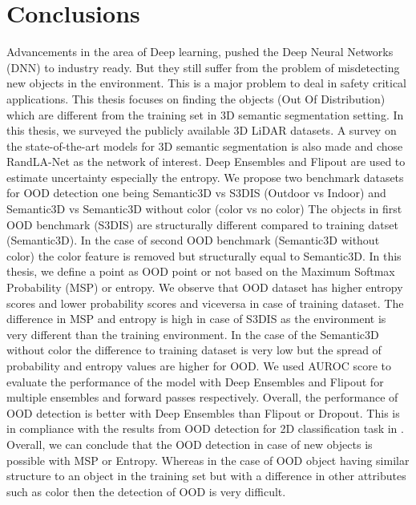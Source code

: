 

    \chapter{Conclusions}
    Advancements in the area of Deep learning, pushed the Deep Neural Networks (DNN) to industry ready.
    But they still suffer from the problem of misdetecting new objects in the environment.
    This is a major problem to deal in safety critical applications.
    This thesis focuses on finding the objects (Out Of Distribution) which are different from the training set in 3D semantic segmentation setting.
    In this thesis, we surveyed the publicly available 3D LiDAR datasets.
    A survey on the  state-of-the-art models for 3D semantic segmentation is also made and chose RandLA-Net as the network of interest.
    Deep Ensembles and Flipout are used to estimate uncertainty especially the entropy. 
    We propose two benchmark datasets for OOD detection one being Semantic3D vs S3DIS (Outdoor vs Indoor) and Semantic3D vs Semantic3D without color (color vs no color)
    The objects in first OOD benchmark (S3DIS) are structurally different compared to training datset (Semantic3D).
    In the case of second OOD benchmark (Semantic3D without color) the color feature is removed but structurally equal to Semantic3D.
    In this thesis, we define a point as OOD point or not based on the Maximum Softmax Probability (MSP) or entropy.
    We observe that OOD dataset has higher entropy scores and lower probability scores and viceversa in case of training dataset.
    The difference in MSP and entropy is high in case of S3DIS as the environment is very different than the training environment.
    In the case of the Semantic3D without color the difference to training dataset is very low but the spread of probability and entropy values are higher for OOD.
    We used AUROC score to evaluate the performance of the model with Deep Ensembles and Flipout for multiple ensembles and forward passes respectively.
    Overall, the performance of OOD detection is better with Deep Ensembles than Flipout or Dropout.
    This is in compliance with the results from OOD detection for 2D classification task in \cite{lakshminarayanan2016simple}.
    Overall, we can conclude that the OOD detection in case of new objects is possible with MSP or Entropy.
    Whereas in the case of OOD object having similar structure to an object in the training set but with a difference in other attributes such as color then the detection of OOD is very difficult.


